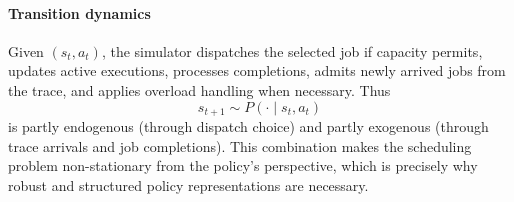 \documentclass[journal]{IEEEtran}
\begin{document}
\paragraph{Transition dynamics}
Given $(s_t,a_t)$, the simulator dispatches the selected job if capacity permits, updates active executions, processes completions, admits newly arrived jobs from the trace, and applies overload handling when necessary. Thus
\begin{equation}
s_{t+1} \sim P(\cdot \mid s_t, a_t)
\end{equation}
is partly endogenous (through dispatch choice) and partly exogenous (through trace arrivals and job completions). This combination makes the scheduling problem non-stationary from the policy’s perspective, which is precisely why robust and structured policy representations are necessary.
\end{document}
